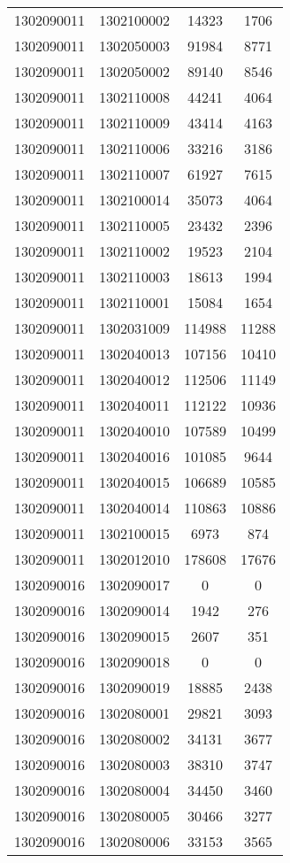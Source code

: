 \begin{longtable}{llcc}
1302090011 & 1302100002 & 14323 & 1706\\
1302090011 & 1302050003 & 91984 & 8771\\
1302090011 & 1302050002 & 89140 & 8546\\
1302090011 & 1302110008 & 44241 & 4064\\
1302090011 & 1302110009 & 43414 & 4163\\
1302090011 & 1302110006 & 33216 & 3186\\
1302090011 & 1302110007 & 61927 & 7615\\
1302090011 & 1302100014 & 35073 & 4064\\
1302090011 & 1302110005 & 23432 & 2396\\
1302090011 & 1302110002 & 19523 & 2104\\
1302090011 & 1302110003 & 18613 & 1994\\
1302090011 & 1302110001 & 15084 & 1654\\
1302090011 & 1302031009 & 114988 & 11288\\
1302090011 & 1302040013 & 107156 & 10410\\
1302090011 & 1302040012 & 112506 & 11149\\
1302090011 & 1302040011 & 112122 & 10936\\
1302090011 & 1302040010 & 107589 & 10499\\
1302090011 & 1302040016 & 101085 & 9644\\
1302090011 & 1302040015 & 106689 & 10585\\
1302090011 & 1302040014 & 110863 & 10886\\
1302090011 & 1302100015 & 6973 & 874\\
1302090011 & 1302012010 & 178608 & 17676\\
1302090016 & 1302090017 & 0 & 0\\
1302090016 & 1302090014 & 1942 & 276\\
1302090016 & 1302090015 & 2607 & 351\\
1302090016 & 1302090018 & 0 & 0\\
1302090016 & 1302090019 & 18885 & 2438\\
1302090016 & 1302080001 & 29821 & 3093\\
1302090016 & 1302080002 & 34131 & 3677\\
1302090016 & 1302080003 & 38310 & 3747\\
1302090016 & 1302080004 & 34450 & 3460\\
1302090016 & 1302080005 & 30466 & 3277\\
1302090016 & 1302080006 & 33153 & 3565\\

\end{longtable}
